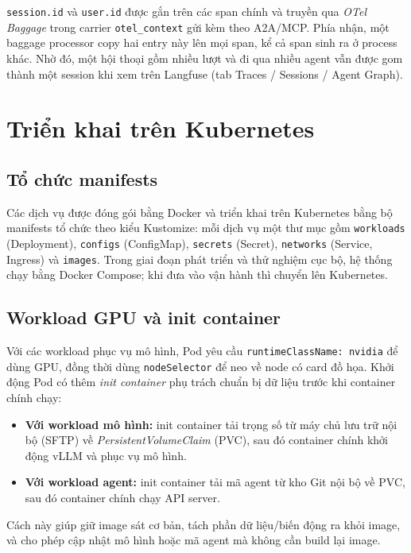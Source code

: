 \texttt{session.id} và \texttt{user.id} được gắn trên các span chính và truyền qua
\emph{OTel Baggage} trong carrier \texttt{otel\_context} gửi kèm theo A2A/MCP. Phía nhận,
một baggage processor copy hai entry này lên mọi span, kể cả span sinh ra ở process khác.
Nhờ đó, một hội thoại gồm nhiều lượt và đi qua nhiều agent vẫn được gom thành một session
khi xem trên Langfuse (tab Traces / Sessions / Agent Graph).

\section{Triển khai trên Kubernetes}
\label{sec:k8s}

\subsection{Tổ chức manifests}

Các dịch vụ được đóng gói bằng Docker và triển khai trên Kubernetes bằng bộ manifests tổ
chức theo kiểu Kustomize: mỗi dịch vụ một thư mục gồm \texttt{workloads} (Deployment),
\texttt{configs} (ConfigMap), \texttt{secrets} (Secret), \texttt{networks} (Service,
Ingress) và \texttt{images}. Trong giai đoạn phát triển và thử nghiệm cục bộ, hệ thống chạy
bằng Docker Compose; khi đưa vào vận hành thì chuyển lên Kubernetes.

\subsection{Workload GPU và init container}

Với các workload phục vụ mô hình, Pod yêu cầu \texttt{runtimeClassName: nvidia} để dùng
GPU, đồng thời dùng \texttt{nodeSelector} để neo về node có card đồ họa. Khởi động Pod có
thêm \emph{init container} phụ trách chuẩn bị dữ liệu trước khi container chính chạy:

\begin{itemize}
  \item \textbf{Với workload mô hình:} init container tải trọng số từ máy chủ lưu trữ nội
  bộ (SFTP) về \emph{PersistentVolumeClaim} (PVC), sau đó container chính khởi động vLLM
  và phục vụ mô hình.
  \item \textbf{Với workload agent:} init container tải mã agent từ kho Git nội bộ về PVC,
  sau đó container chính chạy API server.
\end{itemize}

Cách này giúp giữ image sát cơ bản, tách phần dữ liệu/biến động ra khỏi image, và cho phép
cập nhật mô hình hoặc mã agent mà không cần build lại image.

